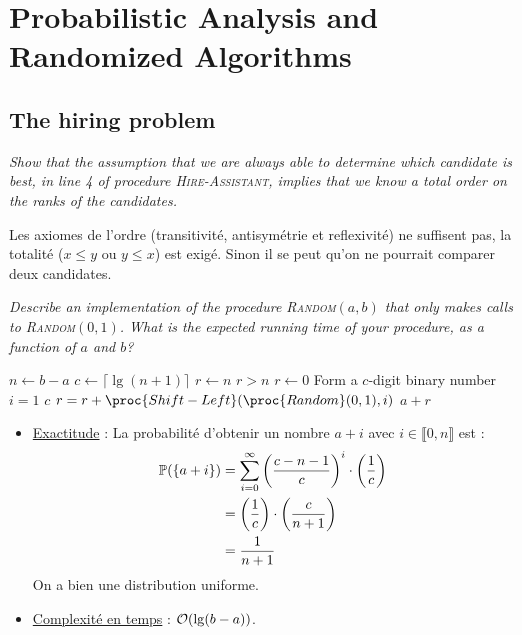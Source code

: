 \section{Probabilistic Analysis and Randomized Algorithms}

\subsection{The hiring problem}

\begin{description}
   {\itshape Show that the assumption that we are always able to determine which candidate is best, in line 4 of procedure {\scshape Hire-Assistant}, implies that we know a total order on the ranks of the candidates.}
    \begin{ex}
      Les axiomes de l'ordre (transitivit\'e, antisym\'etrie et reflexivit\'e) ne suffisent pas, la totalit\'e ($x \le y$ ou $y \le x$) est exig\'e. Sinon il se peut qu'on ne pourrait comparer deux candidates. 
    \end{ex}

  \item[5.1-2 $\star$] {\itshape Describe an implementation of the procedure {\scshape Random}$(a, b)$ that only makes calls to {\scshape Random}$(0, 1)$. What is the expected running time of your procedure, as a function of $a$ and $b$?}
    \begin{ex}
      \begin{codebox} %
        \li $ n \gets b - a$
        \li $ c \gets \lceil \lg (n+1) \rceil$
        \li $ r \gets n$
        \li \While $r > n$ \Do
        \li $ r \gets 0$
        \li \Comment Form a $c$-digit binary number 
        \li \For $i = 1$ \To $c$ \Do
        \li $r = r + \proc{Shift-Left}(\proc{Random}(0,1),i)$ \End \End
        \li \Return $a + r$
      \end{codebox}

    \begin{itemize}
      \item \ul{Exactitude} : La probabilit\'e d'obtenir un nombre $a + i$ avec $i \in \llbracket 0, n \rrbracket$ est :
        \begin{align*}
          \P(\left\{ a+i \right\}) &=  \sum_{i=0}^{\infty}\left( \frac{c-n-1}{c} \right)^i\cdot\left( \frac{1}{c} \right)\\
          &= \left( \frac{1}{c} \right)\cdot\left( \frac{c}{n+1} \right)\\
          &= \frac{1}{n+1}
        \end{align*}
        On a bien une distribution uniforme.
      \item \ul{Complexit\'e en temps} : $\O (\lg (b-a))$. %
    \end{itemize}


\end{ex}
\end{description}
